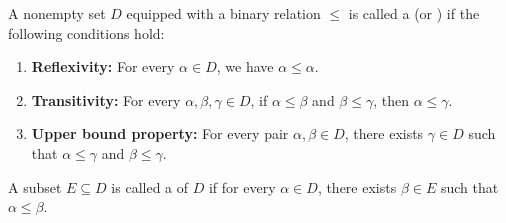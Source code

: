 \begin{definition} \label{definition:directed_set}

    A nonempty set $D$ equipped with a binary relation $\leq$ is called a  (or ) if the following conditions hold:
    \begin{enumerate}
        \item \textbf{Reflexivity:} For every $\alpha \in D$, we have $\alpha \leq \alpha$.
        \item \textbf{Transitivity:} For every $\alpha, \beta, \gamma \in D$, if $\alpha \leq \beta$ and $\beta \leq \gamma$, then $\alpha \leq \gamma$.
        \item \textbf{Upper bound property:} For every pair $\alpha, \beta \in D$, there exists $\gamma \in D$ such that $\alpha \leq \gamma$ and $\beta \leq \gamma$.
    \end{enumerate}

    A subset $E \subseteq D$ is called a  of $D$ if for every $\alpha \in D$, there exists $\beta \in E$ such that $\alpha \leq \beta$.
\end{definition}

